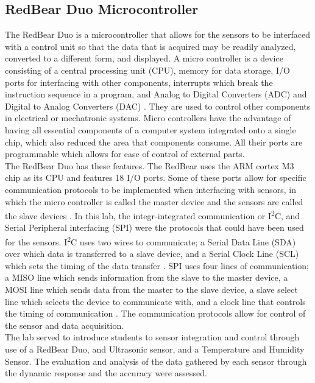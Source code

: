 \documentclass[11pt]{article}
\begin{document}
\subsection{RedBear Duo Microcontroller}

The RedBear Duo is a microcontroller that allows for the sensors to be interfaced with a control unit so that the data that is acquired may be readily analyzed, converted to a different form, and displayed. A micro controller is a device consisting of a central processing unit (CPU), memory for data storage, I/O ports for interfacing with other components, interrupts which break the instruction sequence in a program, and Analog to Digital Converters (ADC) and Digital to Analog Converters (DAC) \cite{Hub}. They are used to control other components in electrical or mechatronic systems. Micro controllers have the advantage of having all essential components of a computer system integrated onto a single chip, which also reduced the area that components consume. All their ports are programmable which allows for ease of control of external parts.\\ 

The RedBear Duo has these features. The RedBear uses the ARM cortex M3 chip as its CPU and features 18 I/O ports. Some of these ports allow for specific communication protocols to be implemented when interfacing with sensors, in which the micro controller is called the master device and the sensors are called the slave devices \cite{Prac}. In this lab, the integr-integrated communication or I\textsuperscript{2}C, and Serial Peripheral interfacing (SPI) were the protocols that could have been used for the sensors. I\textsuperscript{2}C uses two wires to communicate; a Serial Data Line (SDA) over which data is transferred to a slave device, and a Serial Clock Line (SCL) which sets the timing of the data transfer \cite{Prac}. SPI uses four lines of communication; a MISO line which sends information from the slave to the master device, a MOSI line which sends data from the master to the slave device, a slave select line which selects the device to communicate with, and a clock line that controls the timing of communication \cite{Prac}. The communication protocols allow for control of the sensor and data acquisition.\\

The lab served to introduce students to sensor integration and control through use of a RedBear Duo, and Ultrasonic sensor, and a Temperature and Humidity Sensor. The evaluation and analysis of the data gathered by each sensor through the dynamic response and the accuracy were assessed. \\
\end{document}

